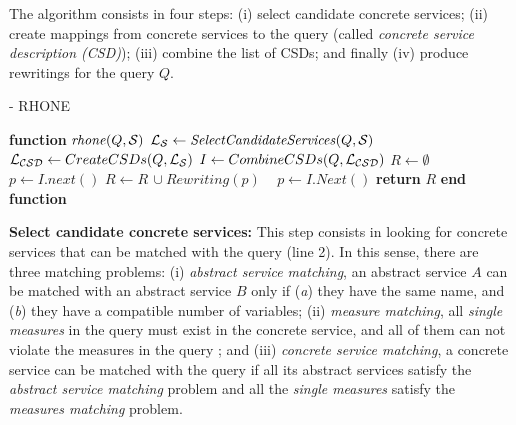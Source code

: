 The algorithm consists in four steps: (i) select candidate concrete services; (ii)
create mappings from concrete services to the query (called \textit{concrete
service description (CSD)}); (iii) combine the list of CSDs; and finally (iv)
produce rewritings for the query $Q$.


\begin{algorithm}
\tiny
\caption{ - RHONE}
\label{algo-rhone}

\begin{algorithmic}[1]
 
\STATE \textbf{function} $\mathit{rhone} (Q, \bigS)$
 \STATE  $\bigLS \leftarrow \mathit{SelectCandidateServices}(Q, \bigS)$ \label{rhone:buildPCD}
 \STATE  $\bigLCSD \leftarrow CreateCSDs(Q, \bigLS)$
 \STATE  $I \leftarrow CombineCSDs(Q, \bigLCSD)$
 \STATE $R\leftarrow \emptyset$
    \STATE $p \leftarrow I.next()$
  \STATE $R\leftarrow R\,\cup \mathit{Rewriting}(p)$
  \STATE ~\!
   \ENDIF
      \STATE $p \leftarrow I.\mathit{Next}()$
 \ENDWHILE
    \STATE \textbf{return} $R$
\STATE \textbf{end function}

\end{algorithmic}

\end{algorithm}


\noindent \textbf{Select candidate concrete services:} This step consists in
 looking for concrete services that can be matched with the query (line 2). In
 this sense, there are three matching problems: 
 (i) \textit{abstract service matching}, an abstract service $A$ can be
 matched with an abstract service $B$ only if (\textit{a}) they have the same
 name, and (\textit{b}) they have a compatible number of variables;
 (ii) \textit{measure matching}, all \textit{single measures} in the query must
 exist in the concrete service, and all of them can not violate the measures in
 the query ; and 
 (iii) \textit{concrete service matching}, a concrete service can
 be matched with the query if all its abstract services satisfy the \textit{abstract service
 matching} problem and all the \textit{single measures} satisfy the \textit{measures matching} problem.
 

